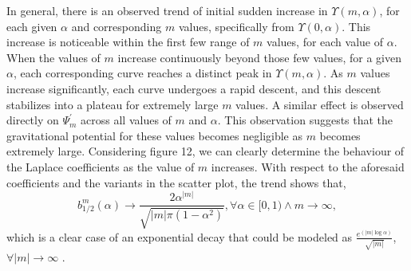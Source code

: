 \documentclass{article}
\begin{document}

In general, there is an observed trend of initial sudden increase in $\Upsilon(m,\alpha)$, for each given $\alpha$ and corresponding $m$ values, specifically from $\Upsilon(0,\alpha)$. This increase is noticeable within the first few range of $m$ values, for each value of $\alpha$. When the values of $m$ increase continuously beyond those few values, for a given $\alpha$, each corresponding curve reaches a distinct peak in $\Upsilon(m,\alpha)$. As $m$ values increase significantly, each curve undergoes a rapid descent, and this descent stabilizes into a plateau for extremely large $m$ values. A similar effect is observed directly on $\Psi_{m}^{'}$ across all values of $m$ and $\alpha$. This observation suggests that the gravitational potential for these values becomes negligible as $m$ becomes extremely large. Considering figure 12, we can clearly determine the behaviour of the Laplace coefficients as the value of $m$ increases. With respect to the aforesaid coefficients and the variants in the scatter plot, the trend shows that,
\begin{equation}
    b_{1/2}^{m}(\alpha) \rightarrow \frac{2\alpha^{|m|}}{\sqrt{|m|\pi(1 - \alpha^{2})}}, \forall \alpha \in [0,1) \land m \rightarrow \infty,
\end{equation}
which is a clear case of an exponential decay that could be modeled as $\frac{e^{(|m|\log\alpha)}}{\sqrt{|m|}}$, $\forall |m| \rightarrow \infty$ \cite{tremaine2023dynamics}.
\end{document}
